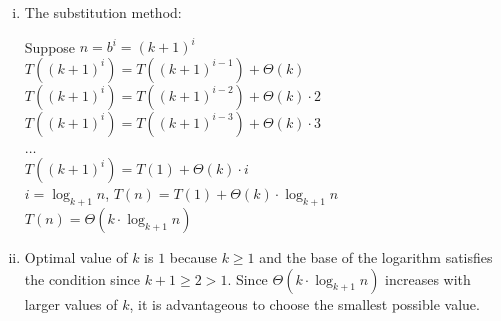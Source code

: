 \documentclass[dvipsnames]{article}
\begin{document}
\begin{enumerate}
\begin{enumerate}[(i)]
    
   \item The substitution method:
    \begin{itemize}
        Suppose $n = b^i = (k+1)^i$\\
        \hspace{30mm} $T((k+1)^i) = T((k+1)^{i-1}) + \Theta(k)$\\
        \hspace{30mm} $T((k+1)^i) = T((k+1)^{i-2}) + \Theta(k) \cdot 2$\\
        \hspace{30mm} $T((k+1)^i) = T((k+1)^{i-3}) + \Theta(k) \cdot 3$\\
        \hspace{30mm} $\dots$\\
        \hspace{30mm} $T((k+1)^i) = T(1) + \Theta(k) \cdot i$\\
        \hspace{30mm} $i = \log_{k+1} n$, $T(n) = T(1) + \Theta(k) \cdot \log_{k+1} n$\\
        \hspace{30mm} $T(n) = \Theta(k \cdot \log_{k+1} n)$\\
    \end{itemize}

\item Optimal value of $k$ is $1$ because $k \geq 1$ and the base of the logarithm satisfies the condition since $k + 1 \geq 2 > 1$. Since $\Theta(k \cdot \log_{k+1} n)$ increases with larger values of $k$, it is advantageous to choose the smallest possible value.
  \end{enumerate}
  \color{black}


\end{enumerate}
\end{document}
